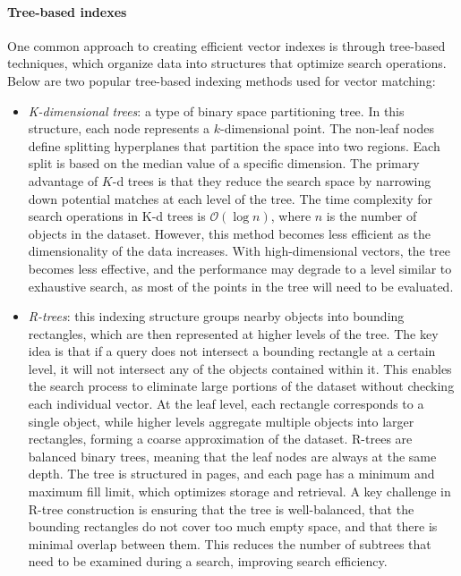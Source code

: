 \paragraph*{Tree-based indexes}
One common approach to creating efficient vector indexes is through tree-based techniques, which organize data into structures that optimize search operations. 
Below are two popular tree-based indexing methods used for vector matching:
\begin{itemize}
    \item \textit{K-dimensional trees}: a type of binary space partitioning tree. 
        In this structure, each node represents a $k$-dimensional point. 
        The non-leaf nodes define splitting hyperplanes that partition the space into two regions. 
        Each split is based on the median value of a specific dimension. 
        The primary advantage of $K$-d trees is that they reduce the search space by narrowing down potential matches at each level of the tree.
        The time complexity for search operations in K-d trees is $\mathcal{O}(\log n)$, where $n$ is the number of objects in the dataset. 
        However, this method becomes less efficient as the dimensionality of the data increases. 
        With high-dimensional vectors, the tree becomes less effective, and the performance may degrade to a level similar to exhaustive search, as most of the points in the tree will need to be evaluated. 
    \item \textit{R-trees}: this indexing structure groups nearby objects into bounding rectangles, which are then represented at higher levels of the tree. 
        The key idea is that if a query does not intersect a bounding rectangle at a certain level, it will not intersect any of the objects contained within it. 
        This enables the search process to eliminate large portions of the dataset without checking each individual vector. 
        At the leaf level, each rectangle corresponds to a single object, while higher levels aggregate multiple objects into larger rectangles, forming a coarse approximation of the dataset.
        R-trees are balanced binary trees, meaning that the leaf nodes are always at the same depth. 
        The tree is structured in pages, and each page has a minimum and maximum fill limit, which optimizes storage and retrieval.
        A key challenge in R-tree construction is ensuring that the tree is well-balanced, that the bounding rectangles do not cover too much empty space, and that there is minimal overlap between them. 
        This reduces the number of subtrees that need to be examined during a search, improving search efficiency.
\end{itemize}

